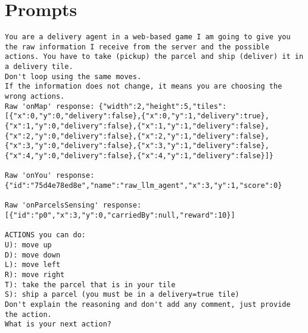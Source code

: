 \chapter{Prompts}
\label{cha:attachment_prompts}
\begin{codewindow}
  [Prompt]  \begin{lstlisting}
You are a delivery agent in a web-based game I am going to give you the raw information I receive from the server and the possible actions. You have to take (pickup) the parcel and ship (deliver) it in a delivery tile.
Don't loop using the same moves.
If the information does not change, it means you are choosing the wrong actions.
Raw 'onMap' response: {"width":2,"height":5,"tiles":[{"x":0,"y":0,"delivery":false},{"x":0,"y":1,"delivery":true},{"x":1,"y":0,"delivery":false},{"x":1,"y":1,"delivery":false},{"x":2,"y":0,"delivery":false},{"x":2,"y":1,"delivery":false},{"x":3,"y":0,"delivery":false},{"x":3,"y":1,"delivery":false},{"x":4,"y":0,"delivery":false},{"x":4,"y":1,"delivery":false}]}

Raw 'onYou' response: {"id":"75d4e78ed8e","name":"raw_llm_agent","x":3,"y":1,"score":0}

Raw 'onParcelsSensing' response: [{"id":"p0","x":3,"y":0,"carriedBy":null,"reward":10}]

ACTIONS you can do:
U): move up
D): move down
L): move left
R): move right
T): take the parcel that is in your tile
S): ship a parcel (you must be in a delivery=true tile)
Don't explain the reasoning and don't add any comment, just provide the action.
What is your next action?
\end{lstlisting}
\end{codewindow}
\clearpage
